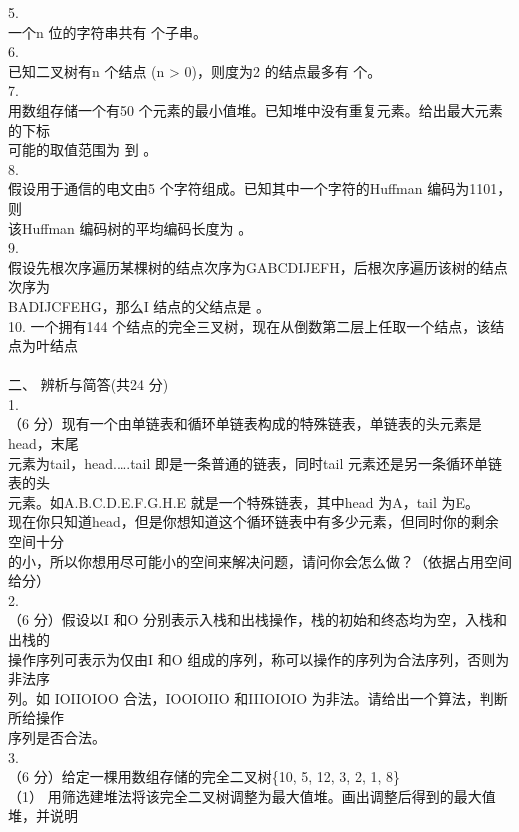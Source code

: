\begin{question}
5.\\
一个n 位的字符串共有                    个子串。\\
6.\\
已知二叉树有n 个结点 (n > 0)，则度为2 的结点最多有            个。\\
7.\\
用数组存储一个有50 个元素的最小值堆。已知堆中没有重复元素。给出最大元素的下标\\
可能的取值范围为           到          。\\
8.\\
假设用于通信的电文由5 个字符组成。已知其中一个字符的Huffman 编码为1101，则\\
该Huffman 编码树的平均编码长度为           。\\
9.\\
假设先根次序遍历某棵树的结点次序为GABCDIJEFH，后根次序遍历该树的结点次序为\\
BADIJCFEHG，那么I 结点的父结点是            。\\
10. 一个拥有144 个结点的完全三叉树，现在从倒数第二层上任取一个结点，该结点为叶结点\\
\\
二、 辨析与简答(共24 分)\\
1.\\
（6 分）现有一个由单链表和循环单链表构成的特殊链表，单链表的头元素是head，末尾\\
元素为tail，head.….tail 即是一条普通的链表，同时tail 元素还是另一条循环单链表的头\\
元素。如A.B.C.D.E.F.G.H.E 就是一个特殊链表，其中head 为A，tail 为E。\\
现在你只知道head，但是你想知道这个循环链表中有多少元素，但同时你的剩余空间十分\\
的小，所以你想用尽可能小的空间来解决问题，请问你会怎么做？（依据占用空间给分）\\
2.\\
（6 分）假设以I 和O 分别表示入栈和出栈操作，栈的初始和终态均为空，入栈和出栈的\\
操作序列可表示为仅由I 和O 组成的序列，称可以操作的序列为合法序列，否则为非法序\\
列。如 IOIIOIOO 合法，IOOIOIIO 和IIIOIOIO 为非法。请给出一个算法，判断所给操作\\
序列是否合法。\\
3.\\
（6 分）给定一棵用数组存储的完全二叉树\{10, 5, 12, 3, 2, 1, 8\}\\
（1） 用筛选建堆法将该完全二叉树调整为最大值堆。画出调整后得到的最大值堆，并说明\\

\end{question}
